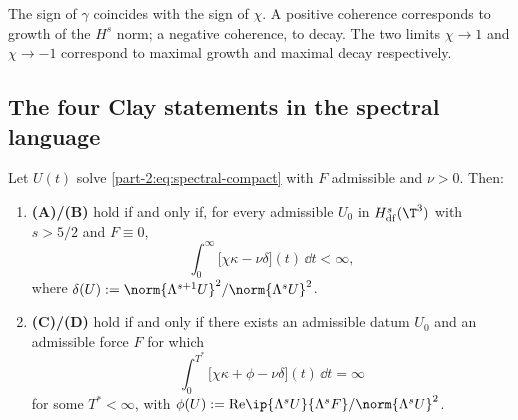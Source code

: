 \begin{remark}\label{part-2:rem:gamma-sign}
The sign of $\gamma$ coincides with the sign of $\chi$. A positive 
coherence corresponds to growth of the $H^s$ norm; a negative 
coherence, to decay. The two limits $\chi\to 1$ and $\chi\to -1$ 
correspond to maximal growth and maximal decay respectively.
\end{remark}

\subsection{The four Clay statements in the spectral language}
\label{part-2:ssec:clay-reform}

\begin{proposition}\label{part-2:prop:clay-reform}
Let $U(t)$ solve \eqref{part-2:eq:spectral-compact} with $F$ admissible and 
$\nu>0$. Then:
\begin{enumerate}[label=(\roman*),leftmargin=*]
\item \textbf{(A)/(B)} hold if and only if, for every admissible 
      $U_0$ in $H^s_{\mathrm{df}}(\T^3)$ with $s>5/2$ and $F\equiv 0$,
      \begin{equation}\label{part-2:eq:AB-criterion}
      \int_0^\infty \bigl[\chi\kappa - \nu\delta\bigr](t)\,\dd t < \infty,
      \end{equation}
      where $\delta(U) := \norm{\Lambda^{s+1}U}^2/\norm{\Lambda^s U}^2$.
\item \textbf{(C)/(D)} hold if and only if there exists an admissible 
      datum $U_0$ and an admissible force $F$ for which
      \begin{equation}\label{part-2:eq:CD-criterion}
      \int_0^{T^\ast} \bigl[\chi\kappa + \phi - \nu\delta\bigr](t)\,\dd t = \infty
      \end{equation}
      for some $T^\ast<\infty$, with 
      $\phi(U) := \mathrm{Re}\ip{\Lambda^s U}{\Lambda^s F}/\norm{\Lambda^s U}^2$.
\end{enumerate}
\end{proposition}

